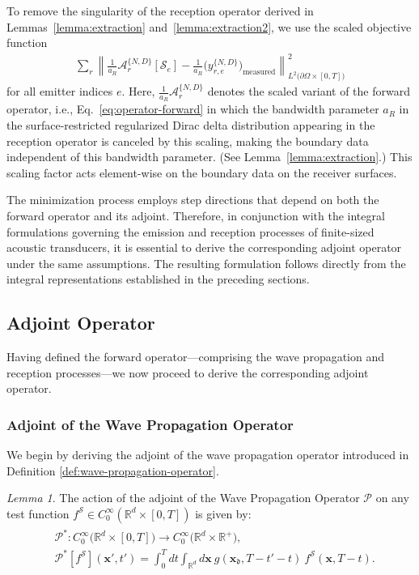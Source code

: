 \documentclass[11pt,reqno]{amsart}
\theoremstyle{remark}
\theoremstyle{italic_lemma}
\newtheorem{lemma}{Lemma}
\newcommand{\bx}{\boldsymbol{x}}
\newcommand{\fd}{\mathfrak{d}}
\begin{document}
To remove the singularity of the reception operator derived in Lemmas~\ref{lemma:extraction} and~\ref{lemma:extraction2}, we use the scaled objective function
\begin{align}
\sum_r \left\| \frac{1}{a_R} \mathcal{A}_r^{\{N,D\}}[\mathcal{S}_e] - \frac{1}{a_R} \bigl(y_{r,e}^{\{N,D\}}\bigr)_{\text{measured}} \right\|_{L^2\big(\partial \Omega \times [0,T]\big)}^2
\end{align}
for all emitter indices \(e\). Here, \( \frac{1}{a_R} \mathcal{A}_r^{\{N,D\}} \) denotes the scaled variant of the forward operator, i.e., Eq.~\eqref{eq:operator-forward} in which the bandwidth parameter \(a_R\) in the surface‑restricted regularized Dirac delta distribution appearing in the reception operator is canceled by this scaling, making the boundary data independent of this bandwidth parameter. (See Lemma~\ref{lemma:extraction}.) This scaling factor acts element-wise on the boundary data on the receiver surfaces.

The minimization process employs step directions that depend on both the forward operator and its adjoint. Therefore, in conjunction with the integral formulations governing the emission and reception processes of finite-sized acoustic transducers, it is essential to derive the corresponding adjoint operator under the same assumptions. The resulting formulation follows directly from the integral representations established in the preceding sections.


\subsection{Adjoint Operator}  
\label{sec:adjoint-op}
Having defined the forward operator—comprising the wave propagation and reception processes—we now proceed to derive the corresponding adjoint operator.

\subsubsection{Adjoint of the Wave Propagation Operator} 

We begin by deriving the adjoint of the wave propagation operator introduced in Definition \ref{def:wave-propagation-operator}.

\begin{lemma}    \label{lemma:adjoint-propagation}
    The action of the adjoint of the Wave Propagation Operator $\mathcal{P}$ on any test function $f^{\mathcal{S}}\in C_0^{\infty} ( \mathbb{R}^d \times [0,T] ) $ is given by:
    \begin{align}   \label{eq:wp-adjoint}
        \begin{split}
           &\mathcal{P}^*: C_0^{\infty} \big( \mathbb{R}^d \times [0,T]  \big)  \rightarrow   C_0^{\infty} \big(\mathbb{R}^d \times \mathbb{R}^+ \big) ,\\
           & \mathcal{P}^* \left[f^{\mathcal{S}}\right](\bx', t' ) = \int_0^T dt \int_{\mathbb{R}^d} d \bx \  g(\bx_{\fd}, T-t'-t ) \  f^{\mathcal{S}}(\bx, T-t).
        \end{split}
    \end{align}
\end{lemma}
\end{document}
